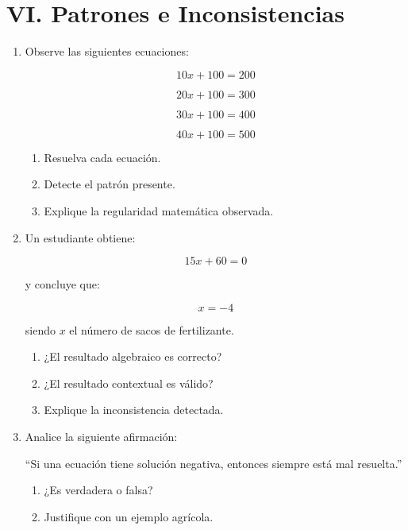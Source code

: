 \documentclass[11pt]{article}
\begin{document}
	\newpage
	\vspace*{0.2cm}
	\section*{VI. Patrones e Inconsistencias}
	
	\begin{enumerate}[label=\textbf{\arabic*.}, start=15]
		
		\item Observe las siguientes ecuaciones:
		
		\[
		10x + 100 = 200
		\]
		
		\[
		20x + 100 = 300
		\]
		
		\[
		30x + 100 = 400
		\]
		
		\[
		40x + 100 = 500
		\]
		
		\begin{enumerate}[label=\alph*)]
			\item Resuelva cada ecuación.
			\item Detecte el patrón presente.
			\item Explique la regularidad matemática observada.
		\end{enumerate}
		
		
		\item Un estudiante obtiene:
		
		\[
		15x + 60 = 0
		\]
		
		y concluye que:
		
		\[
		x = -4
		\]
		
		siendo \(x\) el número de sacos de fertilizante.
		
		\begin{enumerate}[label=\alph*)]
			\item ¿El resultado algebraico es correcto?
			\item ¿El resultado contextual es válido?
			\item Explique la inconsistencia detectada.
		\end{enumerate}
		
		
		\item Analice la siguiente afirmación:
		
		``Si una ecuación tiene solución negativa,
		entonces siempre está mal resuelta.''
		
		\begin{enumerate}[label=\alph*)]
			\item ¿Es verdadera o falsa?
			\item Justifique con un ejemplo agrícola.
		\end{enumerate}
		
	\end{enumerate}
	
\end{document}
